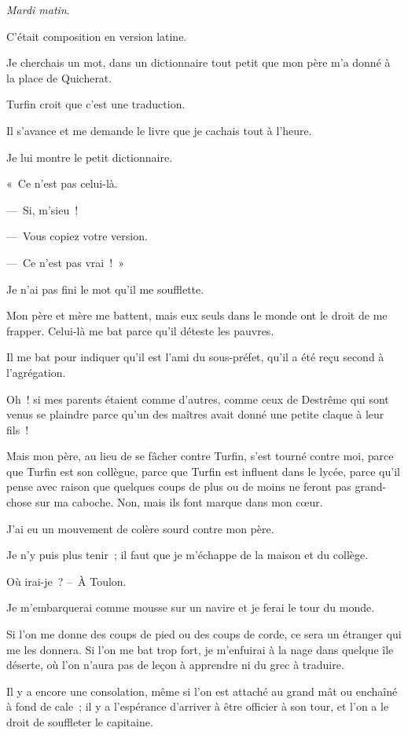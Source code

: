 \documentclass[french,twoside]{book} %
\begin{document}
\bigbreak
\noindent \emph{Mardi matin}.\par
C’était composition en version latine.\par
Je cherchais un mot, dans un dictionnaire tout petit que mon père m’a donné à la place de Quicherat.\par
Turfin croit que c’est une traduction.\par
Il s’avance et me demande le livre que je cachais tout à l’heure.\par
Je lui montre le petit dictionnaire.\par
« Ce n’est pas celui-là.\par
— Si, m’sieu !\par
— Vous copiez votre version.\par
— Ce n’est pas vrai ! »\par
Je n’ai pas fini le mot qu’il me soufflette.\par
Mon père et mère me battent, mais eux seuls dans le monde ont le droit de me frapper. Celui-là me bat parce qu’il déteste les pauvres.\par
Il me bat pour indiquer qu’il est l’ami du sous-préfet, qu’il a été reçu second à l’agrégation.\par
Oh ! si mes parents étaient comme d’autres, comme ceux de Destrême qui sont venus se plaindre parce qu’un des maîtres avait donné une petite claque à leur fils !\par
Mais mon père, au lieu de se fâcher contre Turfin, s’est tourné contre moi, parce que Turfin est son collègue, parce que Turfin est influent dans le lycée, parce qu’il pense avec raison que quelques coups de plus ou de moins ne feront pas grand-chose sur ma caboche. Non, mais ils font marque dans mon cœur.\par
J’ai eu un mouvement de colère sourd contre mon père.\par
Je n’y puis plus tenir ; il faut que je m’échappe de la maison et du collège.\par
\bigbreak
\noindent Où irai-je ? – À Toulon.\par
Je m’embarquerai comme mousse sur un navire et je ferai le tour du monde.\par
Si l’on me donne des coups de pied ou des coups de corde, ce sera un étranger qui me les donnera. Si l’on me bat trop fort, je m’enfuirai à la nage dans quelque île déserte, où l’on n’aura pas de leçon à apprendre ni du grec à traduire.\par
Il y a encore une consolation, même si l’on est attaché au grand mât ou enchaîné à fond de cale ; il y a l’espérance d’arriver à être officier à son tour, et l’on a le droit de souffleter le capitaine.\par
\end{document}
